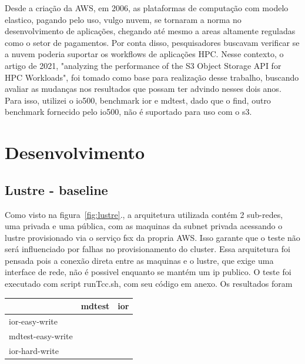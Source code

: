 \documentclass[article,a4paper,12pt,brazil,sumario=tradicional]{abntex2}
\begin{document}
Desde a criação da AWS, em 2006, as plataformas de computação com modelo elastico, pagando pelo uso, vulgo nuvem, se tornaram a norma no desenvolvimento de aplicações, chegando até mesmo a areas altamente reguladas como o setor de pagamentos. Por conta disso, pesquisadores buscavam verificar se a nuvem poderia suportar os workflows de aplicações HPC. Nesse contexto, o artigo de 2021, "analyzing the performance of the S3 Object Storage API for HPC Workloads", foi tomado como base para realização desse trabalho, buscando avaliar as mudanças nos resultados que possam ter advindo nesses dois anos. Para isso, utilizei o io500, benchmark ior e mdtest, dado que o find, outro benchmark fornecido pelo io500, não é suportado para uso com o s3.

\section{Desenvolvimento}

\subsection{Lustre - baseline}
Como visto na figura~\ref{fig:lustre}., a arquitetura utilizada contém 2 sub-redes, uma privada e uma pública, com as maquinas da subnet privada acessando o lustre provisionado via o serviço fsx da propria AWS. Isso garante que o teste não será influenciado por falhas no provisionamento do cluster. Essa arquitetura foi pensada pois a conexão direta entre as maquinas e o lustre, que exige uma interface de rede, não é possivel enquanto se mantém um ip publico. O teste foi executado com script runTcc.sh, com seu código em anexo. Os resultados foram

\begin{table}[htb]
	\begin{tabular}{|l|l|l|}
		\hline
		& mdtest & ior \\ \hline
		ior-easy-write    &        &     \\ \hline
		mdtest-easy-write &        &     \\ \hline
		ior-hard-write    &        &     \\ \hline
	\end{tabular}
\end{table}
\end{document}
